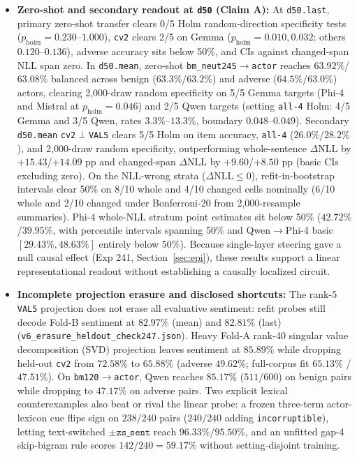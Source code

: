 \documentclass[conference]{IEEEtran}
\begin{document}
\begin{itemize}
  \item \textbf{Zero-shot and secondary readout at \texttt{d50} (Claim A):} At \texttt{d50.last}, primary zero-shot transfer clears 0/5 Holm random-direction specificity tests ($p_{\text{holm}}=0.230$--$1.000$), \texttt{cv2} clears 2/5 on Gemma ($p_{\text{holm}}=0.010, 0.032$; others $0.120$--$0.136$), adverse accuracy sits below 50\%, and CIs against changed-span NLL span zero. In \texttt{d50.mean}, zero-shot \texttt{bm\_neut245}$\to$\texttt{actor} reaches $63.92\%$/$63.08\%$ balanced across benign ($63.3\%$/$63.2\%$) and adverse ($64.5\%$/$63.0\%$) actors, clearing 2,000-draw random specificity on 5/5 Gemma targets (Phi-4 and Mistral at $p_{\text{holm}}=0.046$) and 2/5 Qwen targets (setting \texttt{all-4} Holm: 4/5 Gemma and 3/5 Qwen, rates $3.3\%$--$13.3\%$, boundary $0.048$--$0.049$). Secondary \texttt{d50.mean} \texttt{cv2}$\perp$\texttt{VAL5} clears 5/5 Holm on item accuracy, \texttt{all-4} ($26.0\%$/$28.2\%$), and 2,000-draw random specificity, outperforming whole-sentence $\Delta$NLL by $+15.43$/$+14.09$ pp and changed-span $\Delta$NLL by $+9.60$/$+8.50$ pp (basic CIs excluding zero). On the NLL-wrong strata ($\Delta\text{NLL}\le0$), refit-in-bootstrap intervals clear 50\% on 8/10 whole and 4/10 changed cells nominally (6/10 whole and 2/10 changed under Bonferroni-20 from 2,000-resample summaries). Phi-4 whole-NLL stratum point estimates sit below 50\% ($42.72\%$/$39.95\%$, with percentile intervals spanning 50\% and Qwen$\to$Phi-4 basic $[29.43\%, 48.63\%]$ entirely below 50\%). Because single-layer steering gave a null causal effect (Exp 241, Section~\ref{sec:epi}), these results support a linear representational readout without establishing a causally localized circuit.
  \item \textbf{Incomplete projection erasure and disclosed shortcuts:} The rank-5 \texttt{VAL5} projection does not erase all evaluative sentiment: refit probes still decode Fold-B sentiment at $82.97\%$ (mean) and $82.81\%$ (last) (\texttt{v6\_erasure\_heldout\_check247.json}). Heavy Fold-A rank-40 singular value decomposition (SVD) projection leaves sentiment at $85.89\%$ while dropping held-out \texttt{cv2} from $72.58\%$ to $65.88\%$ (adverse $49.62\%$; full-corpus fit $65.13\%$ / $47.51\%$). On \texttt{bm120}$\to$\texttt{actor}, Qwen reaches $85.17\%$ ($511/600$) on benign pairs while dropping to $47.17\%$ on adverse pairs. Two explicit lexical counterexamples also beat or rival the linear probe: a frozen three-term actor-lexicon cue flips sign on $238/240$ pairs ($240/240$ adding \texttt{incorruptible}), letting text-switched $\pm\texttt{zs\_sent}$ reach $96.33\%$/$95.50\%$, and an unfitted gap-4 skip-bigram rule scores $142/240=59.17\%$ without setting-disjoint training.
\end{itemize}
\end{document}

